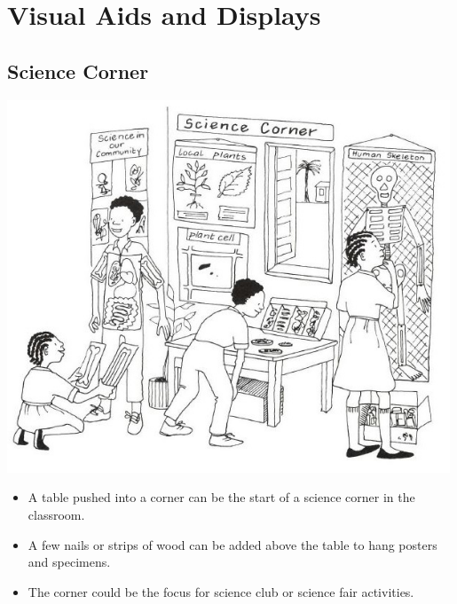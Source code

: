 \chapter{Visual Aids and Displays}


\section{Science Corner}

\begin{center}
\includegraphics[width=0.99\textwidth]{./img/vso/science-corner.jpg}
\end{center}

\begin{itemize}
\item A table pushed into a corner can be the start of a science corner in
the classroom.
\item A few nails or strips of wood can be added above the table to hang
posters and specimens.
\item The corner could be the focus for science club or science fair activities.
\end{itemize}

\vfill
\pagebreak


